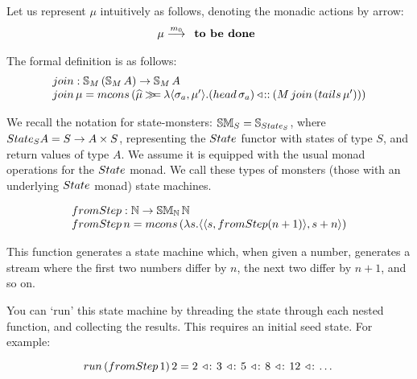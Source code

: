 Let us represent $\mu$ intuitively as follows, denoting the monadic actions by arrow:
$$
\mu \stackrel{m_0}{\longrightarrow}
\begin{array}[t]{l}
\mbox{\bf to be done}
\end{array}
$$

The formal definition is as follows:
$$
\begin{array}{l}
\join : \stream{M}\,(\stream{M}\,A) \rightarrow \stream{M}\,A\\
\join\,\mu = \mcons\,(\unc{\mu} \bind \lambda \pair{\sigma_a}{\mu'}.
              (\head\,\sigma_a) \fcons (M\,\join\,(\tails\,\mu')))
\end{array}
$$




We recall the notation for state-monsters: $\stmon{S} = \stream{\state_S}$, where $\state_S A = S \rightarrow A \times S$, representing the $\state$ functor with states of type $S$, and return values of type $A$. 
We assume it is equipped with the usual monad operations for the $\state$ monad. We call these types of monsters (those with an underlying $\state$ monad) state machines.

$$
\begin{array}{l}
\fromstepstr : \nat \rightarrow \stmon{\nat}\,\nat \\
\fromstepstr\, n = \mcons\, (\lambda s. \pair{\pair{s}{\fromstepstr (n + 1)}}{s + n})
\end{array}
$$

This function generates a state machine which, when given a number, generates a stream where the first two numbers differ by $n$, the next two differ by $n + 1$, and so on.

You can `run' this state machine by threading the state through each nested function, and collecting the results. This requires an initial seed state. For example:

$$
\strun\,(\fromstepstr\, 1)\, 2 = 2\, \acons\, 3\, \acons\, 5\, \acons\, 8\, \acons\, 12\, \acons\, \dots
$$

